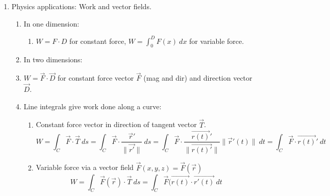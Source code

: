 \documentclass{article}
\begin{document}
\begin{enumerate}
\item Physics applications: Work and vector fields.
\begin{enumerate}
\item In one dimension:
\begin{enumerate}
\item $W = F \cdot D$ for constant force, $W = \int_0^D F(x) ~dx$ for variable force.
\end{enumerate}
\item In two dimensions:
\item $W = \vec{F} \cdot \vec{D}$ for constant force vector $\vec{F}$ (mag and dir) and direction vector $\vec{D}$.
\item Line integrals give work done along a curve:
\begin{enumerate}
\item Constant force vector in direction of tangent vector $\vec{T}$.
\[
W = \int_C \vec{F} \cdot \vec{T} ~ds = \int_C \vec{F} \cdot \frac{\vec{r}'}{\|\vec{r'}\|} ~ds = \int_C \vec{F} \cdot \frac{\vec{r(t)}'}{\|\vec{r(t)'}\|} \|\vec{r}'(t)\| ~dt = \int_C \vec{F} \cdot \vec{r(t)}' ~dt
\]
\item Variable force via a vector field $\vec{F}(x,y,z) = \vec{F}(\vec{r})$
\[
W = \int_C \vec{F}(\vec{r}) \cdot \vec{T} ~ds = \int_C \vec{F}(\vec{r(t)} \cdot \vec{r'(t)} ~dt
\]
\end{enumerate}
\end{enumerate}


\end{enumerate}
\end{document}
